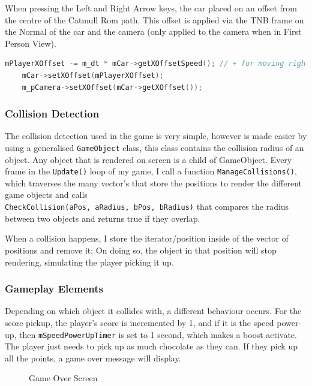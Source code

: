 \documentclass[11pt]{report}
\begin{document}
When pressing the Left and Right Arrow keys, the car placed on an offset from the centre of the Catmull Rom path. This offset is applied via the TNB frame on the Normal of the car and the camera (only applied to the camera when in First Person View).
\begin{lstlisting}[language=c]
    mPlayerXOffset -= m_dt * mCar->getXOffsetSpeed(); // + for moving right
    mCar->setXOffset(mPlayerXOffset);
    m_pCamera->setXOffset(mCar->getXOffset());
\end{lstlisting}

\subsubsection*{Collision Detection}
The collision detection used in the game is very simple, however is made easier by using a generalised \colorbox{mygrey}{\lstinline{GameObject}} class, this class contains the collision radius of an object. Any object that is rendered on screen is a child of GameObject. Every frame in the \colorbox{mygrey}{\lstinline{Update()}} loop of my game, I call a function \colorbox{mygrey}{\lstinline{ManageCollisions()}}, which traverses the many vector's that store the positions to render the different game objects and calls \\ \colorbox{mygrey}{\lstinline{CheckCollision(aPos, aRadius, bPos, bRadius)}} that compares the radius between two objects and returns true if they overlap.

When a collision happens, I store the iterator/position inside of the vector of positions and remove it; On doing so, the object in that position will stop rendering, simulating the player picking it up.

\subsubsection*{Gameplay Elements}
Depending on which object it collides with, a different behaviour occurs. For the score pickup, the player's score is incremented by 1, and if it is the speed power-up, then \colorbox{mygrey}{\lstinline{mSpeedPowerUpTimer}} is set to 1 second, which makes a boost activate. The player just needs to pick up as much chocolate as they can. If they pick up all the points, a game over message will display.
\begin{figure}[H]
    \centering
    \caption{Game Over Screen}
\end{figure}
\end{document}
